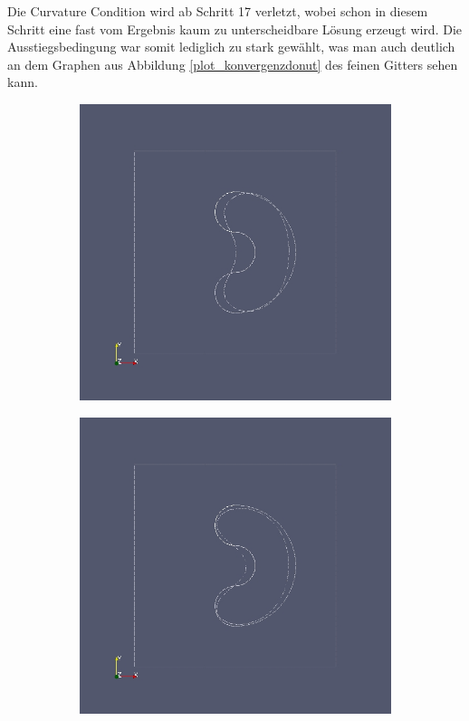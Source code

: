 Die Curvature Condition wird ab Schritt 17 verletzt, wobei schon in diesem Schritt eine fast vom Ergebnis kaum zu unterscheidbare Lösung erzeugt wird. Die Ausstiegsbedingung war somit lediglich zu stark gewählt, was man auch deutlich an dem Graphen aus Abbildung \ref{plot_konvergenzdonut} des feinen Gitters sehen kann. 

\begin{figure}
	\begin{subfigure}{0.5\textwidth}
	\centering
	\includegraphics[scale=0.25]{pic_brokendonut_bfgs_linesearch.jpg}
	\caption{}	
	\end{subfigure}
	\begin{subfigure}{0.5\textwidth}
	\centering
	\includegraphics[scale=0.25]{pic_brokendonut_bfgs_linesearch_fine.jpg}

\end{subfigure}
\end{figure}
